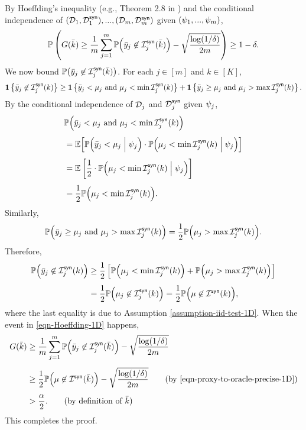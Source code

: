 By Hoeffding's inequality (e.g., Theorem 2.8 in \cite{BLM13}) and the conditional independence of $(\mathcal{D}_1,\mathcal{D}^{\mathsf{syn}}_1),...,(\mathcal{D}_m,\mathcal{D}^{\mathsf{syn}}_m)$ given $(\psi_1,...,\psi_m)$,
\begin{equation}\label{eqn-Hoeffding-1D}
\mathbb{P}\left( G(\bar{k}) \ge \frac{1}{m} \sum_{j=1}^m \mathbb{P}\Big( \bar{y}_j \not\in \mathcal{I}^{\mathsf{syn}}_j(\bar{k}) \Big) -  \sqrt{\frac{\log(1/\delta)}{2m}} \right) \ge 1-\delta.
\end{equation}
We now bound $\mathbb{P}\big( \bar{y}_j \not\in \mathcal{I}^{\mathsf{syn}}_j(\bar{k}) \big)$. For each $j\in[m]$ and $k\in[K]$,
\[
\operatorname{\mathbf{1}} \left\{ \bar{y}_j \not\in \mathcal{I}^{\mathsf{syn}}_j(k) \right\}
\ge 
\operatorname{\mathbf{1}} \left\{ \bar{y}_j < \mu_{j} \text{ and } \mu_{j} < \min \mathcal{I}^{\mathsf{syn}}_j(k) \right\}
+
\operatorname{\mathbf{1}} \left\{ \bar{y}_j \ge \mu_{j} \text{ and } \mu_{j} > \max \mathcal{I}^{\mathsf{syn}}_j(k) \right\}.
\]
By the conditional independence of $\mathcal{D}_j$ and $\mathcal{D}^{\mathsf{syn}}_j$ given $\psi_j$,
\begin{align*}
& \mathbb{P} \Big( \bar{y}_j < \mu_{j} \text{ and } \mu_{j} < \min \mathcal{I}^{\mathsf{syn}}_j(k) \Big) \\[4pt]
&=
\mathbb{E}\Big[ \mathbb{P} \Big( \bar{y}_j < \mu_{j} \Bigm| \psi_j \Big) \cdot \mathbb{P} \Big( \mu_{j} < \min \mathcal{I}^{\mathsf{syn}}_j(k)  \Bigm| \psi_j \Big) \Big] \\[4pt]
&=
\mathbb{E}\left[ \frac{1}{2} \cdot \mathbb{P} \Big( \mu_{j} < \min \mathcal{I}^{\mathsf{syn}}_j(k)  \Bigm| \psi_j \Big) \right] \\[4pt]
&=
\frac{1}{2} \mathbb{P}\Big( \mu_{j} < \min \mathcal{I}^{\mathsf{syn}}_j(k)  \Big).
\end{align*}
Similarly,
\[
\mathbb{P} \Big( \bar{y}_j \ge \mu_{j} \text{ and } \mu_{j} > \max \mathcal{I}^{\mathsf{syn}}_j(k) \Big)
=
\frac{1}{2} \mathbb{P}\Big( \mu_{j} > \max \mathcal{I}^{\mathsf{syn}}_j(k) \Big).
\]
Therefore,
\begin{align}
\mathbb{P} \Big( \bar{y}_j \not\in \mathcal{I}^{\mathsf{syn}}_j(k) \Big)
&\ge 
\frac{1}{2} \left[ \mathbb{P}\Big( \mu_{j} < \min \mathcal{I}^{\mathsf{syn}}_j(k) \Big) + \mathbb{P}\Big( \mu_{j} > \max \mathcal{I}^{\mathsf{syn}}_j(k) \Big) \right] \notag \\[4pt]
&=
\frac{1}{2} \mathbb{P} \Big( \mu_{j} \not\in \mathcal{I}^{\mathsf{syn}}_j(k) \Big)
=
\frac{1}{2} \mathbb{P} \Big( \mu \not\in \mathcal{I}^{\mathsf{syn}}(k) \Big), \label{eqn-proxy-to-oracle-precise-1D}
\end{align}
where the last equality is due to Assumption \ref{assumption-iid-test-1D}. When the event in \eqref{eqn-Hoeffding-1D} happens,
\begin{align*}
\coverage(\bar{k}) 
&
\ge \frac{1}{m} \sum_{j=1}^m \PP\Big( \responsebar_j \not\in \simCI_j(\bar{k}) \Big) -  \sqrt{\frac{\log(1/\delta)}{2m}} \\[4pt]
&\ge 
\frac{1}{2} \PP \Big( \mean \not\in \simCI(\bar{k}) \Big) -  \sqrt{\frac{\log(1/\delta)}{2m}} \tag{by \eqref{eqn-proxy-to-oracle-precise-1D}} \\[4pt]
&> 
\frac{\alpha}{2}. \tag{by definition of $\bar{k}$}
\end{align*}
This completes the proof.


